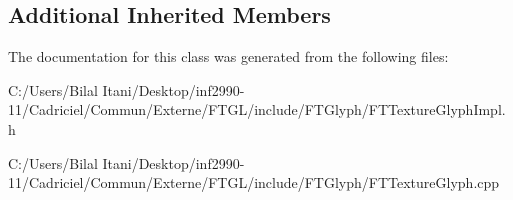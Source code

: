 \subsection*{Additional Inherited Members}


The documentation for this class was generated from the following files\+:\begin{DoxyCompactItemize}
\item 
C\+:/\+Users/\+Bilal Itani/\+Desktop/inf2990-\/11/\+Cadriciel/\+Commun/\+Externe/\+F\+T\+G\+L/include/\+F\+T\+Glyph/F\+T\+Texture\+Glyph\+Impl.\+h\item 
C\+:/\+Users/\+Bilal Itani/\+Desktop/inf2990-\/11/\+Cadriciel/\+Commun/\+Externe/\+F\+T\+G\+L/include/\+F\+T\+Glyph/F\+T\+Texture\+Glyph.\+cpp\end{DoxyCompactItemize}
